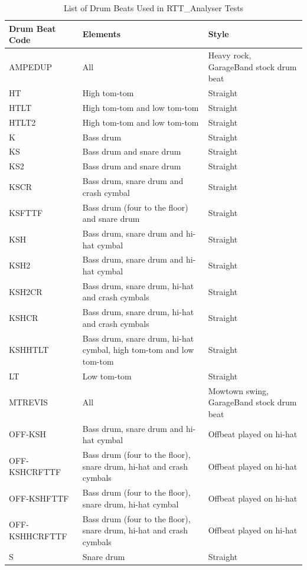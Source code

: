 \documentclass[a4paper, 11pt]{article}
\begin{document}
\begin{table}[htbp]
\caption{List of Drum Beats Used in RTT\_Analyser Tests} 
\centering
\begin{tabular}{|p{3cm}|p{5cm}|l|}
\hline
\textbf{Drum Beat Code} & \textbf{Elements} & \textbf{Style} \\ [0.5ex]
\hline 
AMPEDUP & All & Heavy rock, GarageBand stock drum beat\\
\hline 
HT & High tom-tom & Straight\\
\hline 
HTLT & High tom-tom and low tom-tom & Straight\\
\hline 
HTLT2 & High tom-tom and low tom-tom & Straight\\
\hline 
K & Bass drum & Straight\\
\hline 
KS & Bass drum and snare drum & Straight\\
\hline 
KS2 & Bass drum and snare drum & Straight\\
\hline 
KSCR & Bass drum, snare drum and crash cymbal & Straight\\
\hline 
KSFTTF & Bass drum (four to the floor) and snare drum & Straight\\
\hline 
KSH & Bass drum, snare drum and hi-hat cymbal & Straight\\
\hline 
KSH2 & Bass drum, snare drum and hi-hat cymbal & Straight\\
\hline 
KSH2CR & Bass drum, snare drum, hi-hat and crash cymbals & Straight\\
\hline 
KSHCR & Bass drum, snare drum, hi-hat and crash cymbals & Straight\\
\hline 
KSHHTLT & Bass drum, snare drum, hi-hat cymbal, high tom-tom and low tom-tom & Straight\\
\hline 
LT & Low tom-tom & Straight\\
\hline 
MTREVIS & All & Mowtown swing, GarageBand stock drum beat\\
\hline 
OFF-KSH & Bass drum, snare drum and hi-hat cymbal & Offbeat played on hi-hat\\
\hline 
OFF-KSHCRFTTF & Bass drum (four to the floor), snare drum, hi-hat and crash cymbals & Offbeat played on hi-hat\\
\hline 
OFF-KSHFTTF & Bass drum (four to the floor), snare drum, hi-hat cymbal & Offbeat played on hi-hat\\
\hline 
OFF-KSHHCRFTTF & Bass drum (four to the floor), snare drum, hi-hat and crash cymbals & Offbeat played on hi-hat\\
\hline 
S & Snare drum & Straight\\

\end{tabular}
\end{table}
\end{document}
